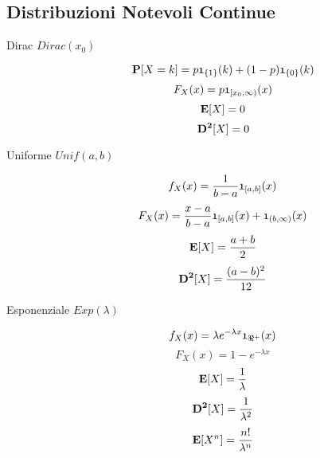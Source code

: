 \subsection{Distribuzioni Notevoli Continue}
\begin{description}
	
	\item[Dirac $Dirac(x_{0})$]
		\begin{equation}
		\mathbf{P}[X=k] = p\mathfrak{1}_{\{1\}}(k)+(1-p)\mathfrak{1}_{\{0\}}(k)
		\end{equation}
		\begin{equation}
		F_{X}(x)=p\mathfrak{1}_{[x_{0},\infty)}(x)
		\end{equation}
		\begin{equation}
		\mathbf{E}[X]=0
		\end{equation}
		\begin{equation}
		\mathbf{D^{2}}[X]=0
		\end{equation}
	
	\item[Uniforme $Unif(a,b)$]
		\begin{equation}
		f_{X}(x)=\frac{1}{b-a}\mathfrak{1}_{[a,b]}(x)
		\end{equation}
		\begin{equation}
		F_{X}(x)=\frac{x-a}{b-a}\mathfrak{1}_{[a,b]}(x)+\mathfrak{1}_{(b,\infty)}(x)
		\end{equation}
		\begin{equation}
		\mathbf{E}[X]=\frac{a+b}{2}
		\end{equation}
		\begin{equation}
		\mathbf{D^{2}}[X]=\frac{(a-b)^{2}}{12}
		\end{equation}
		
	\item[Esponenziale $Exp(\lambda)$]
		\begin{equation}
		f_{X}(x)=\lambda e^{-\lambda x} \mathfrak{1}_{\Re^{+}}(x)
		\end{equation}
		\begin{equation}
		F_{X}(x)=1-e^{-\lambda x}
		\end{equation}
		\begin{equation}
		\mathbf{E}[X]=\frac{1}{\lambda}
		\end{equation}
		\begin{equation}
		\mathbf{D^{2}}[X]=\frac{1}{\lambda^{2}}
		\end{equation}
		\begin{equation}
		\mathbf{E}[X^{n}]=\frac{n!}{\lambda^{n}}
		\end{equation}
		

\end{description}
